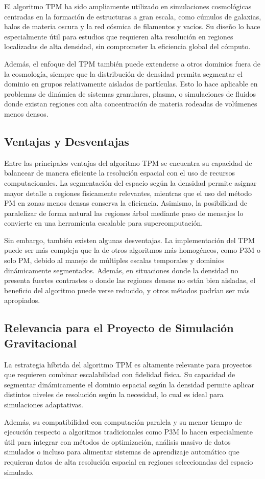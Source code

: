 El algoritmo TPM ha sido ampliamente utilizado en simulaciones cosmológicas centradas en la formación de estructuras a gran escala, como cúmulos de galaxias, halos de materia oscura y la red cósmica de filamentos y vacíos. Su diseño lo hace especialmente útil para estudios que requieren alta resolución en regiones localizadas de alta densidad, sin comprometer la eficiencia global del cómputo.

Además, el enfoque del TPM también puede extenderse a otros dominios fuera de la cosmología, siempre que la distribución de densidad permita segmentar el dominio en grupos relativamente aislados de partículas. Esto lo hace aplicable en problemas de dinámica de sistemas granulares, plasma, o simulaciones de fluidos donde existan regiones con alta concentración de materia rodeadas de volúmenes menos densos.

\subsection{Ventajas y Desventajas}

Entre las principales ventajas del algoritmo TPM se encuentra su capacidad de balancear de manera eficiente la resolución espacial con el uso de recursos computacionales. La segmentación del espacio según la densidad permite asignar mayor detalle a regiones físicamente relevantes, mientras que el uso del método PM en zonas menos densas conserva la eficiencia. Asimismo, la posibilidad de paralelizar de forma natural las regiones árbol mediante paso de mensajes lo convierte en una herramienta escalable para supercomputación.

Sin embargo, también existen algunas desventajas. La implementación del TPM puede ser más compleja que la de otros algoritmos más homogéneos, como P3M o solo PM, debido al manejo de múltiples escalas temporales y dominios dinámicamente segmentados. Además, en situaciones donde la densidad no presenta fuertes contrastes o donde las regiones densas no están bien aisladas, el beneficio del algoritmo puede verse reducido, y otros métodos podrían ser más apropiados.

\subsection{Relevancia para el Proyecto de Simulación Gravitacional}

La estrategia híbrida del algoritmo TPM es altamente relevante para proyectos que requieren combinar escalabilidad con fidelidad física. Su capacidad de segmentar dinámicamente el dominio espacial según la densidad permite aplicar distintos niveles de resolución según la necesidad, lo cual es ideal para simulaciones adaptativas.

Además, su compatibilidad con computación paralela y su menor tiempo de ejecución respecto a algoritmos tradicionales como P3M lo hacen especialmente útil para integrar con métodos de optimización, análisis masivo de datos simulados o incluso para alimentar sistemas de aprendizaje automático que requieran datos de alta resolución espacial en regiones seleccionadas del espacio simulado.
